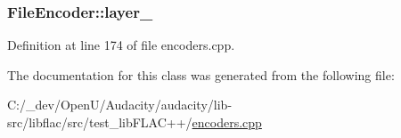 \subsubsection[{\texorpdfstring{layer\+\_\+}{layer_}}]{ File\+Encoder\+::layer\+\_\+}\hypertarget{class_file_encoder_ab467ba85a87203d856af1def53102df3}{}\label{class_file_encoder_ab467ba85a87203d856af1def53102df3}


Definition at line 174 of file encoders.\+cpp.



The documentation for this class was generated from the following file\+:\begin{DoxyCompactItemize}
\item 
C\+:/\+\_\+dev/\+Open\+U/\+Audacity/audacity/lib-\/src/libflac/src/test\+\_\+lib\+F\+L\+A\+C++/\hyperlink{encoders_8cpp}{encoders.\+cpp}\end{DoxyCompactItemize}
